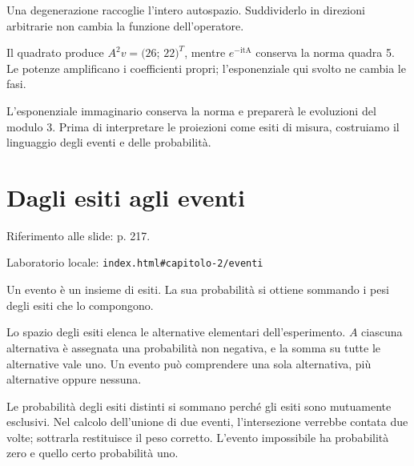 Una degenerazione raccoglie l'intero autospazio. Suddividerlo in direzioni arbitrarie non cambia la funzione dell'operatore.\par



Il quadrato produce \(A^{2}v=(26\); \(22)^{T}\), mentre \(e^{- \text{itA}}\) conserva la norma quadra 5. Le potenze amplificano i coefficienti propri; l'esponenziale qui svolto ne cambia le fasi.\par


L'esponenziale immaginario conserva la norma e preparerà le evoluzioni del modulo 3. Prima di interpretare le proiezioni come esiti di misura, costruiamo il linguaggio degli eventi e delle probabilità.\par



\Needspace{.43\textheight}
\section{Dagli esiti agli eventi}
\label{c2-eventi}

{\sffamily\small\color{Ink!70} Riferimento alle slide: p. 217.\par}

{\sffamily\small\color{Ink!70} Laboratorio locale: \nolinkurl{index.html#capitolo-2/eventi}\par}

Un evento è un insieme di esiti. La sua probabilità si ottiene sommando i pesi degli esiti che lo compongono.\par

Lo spazio degli esiti elenca le alternative elementari dell'esperimento. \(A\) ciascuna alternativa è assegnata una probabilità non negativa, e la somma su tutte le alternative vale uno. Un evento può comprendere una sola alternativa, più alternative oppure nessuna.\par

Le probabilità degli esiti distinti si sommano perché gli esiti sono mutuamente esclusivi. Nel calcolo dell'unione di due eventi, l'intersezione verrebbe contata due volte; sottrarla restituisce il peso corretto. L'evento impossibile ha probabilità zero e quello certo probabilità uno.\par



